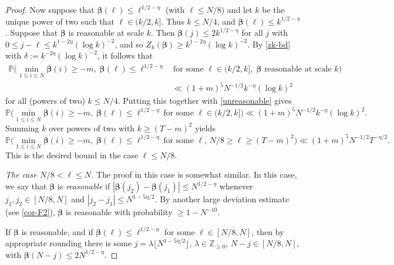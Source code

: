 \documentclass[11pt,reqno]{amsart}
\numberwithin{equation}{section}
\theoremstyle{definition}
\theoremstyle{remark}
\newcommand{\mb}{\mathbb}
\def\boldbeta{\boldsymbol\beta}
\renewcommand{\le}{\leqslant}
\renewcommand{\ge}{\geqslant}
\newcommand\Z{\mathbb{Z}}
\begin{document}
\begin{proof}
Now suppose that $\boldbeta(\ell) \le \ell^{1/2 - \eta}$ (with $\ell \le N/8$) and let $k$ be the unique power of two such that $\ell \in (k/2, k]$. Thus $k \le N/4$, and $\boldbeta(\ell) \le k^{1/2 - \eta}$. Suppose that $\boldbeta$ is reasonable at scale $k$. Then $\boldbeta(j) \le 2 k^{1/2 - \eta}$ for all $j$ with $0 \le j - \ell \le k^{1 - 2\eta} (\log k)^{-2}$, and so $Z_k(\boldbeta) \ge k^{1 - 2\eta} (\log k)^{-2}$. By \cref{zk-bd} with $\delta := k^{-2\eta} (\log k)^{-2}$, it follows that 
\begin{align*} \mb{P} \big( \min_{1 \le i \le N} \boldbeta(i) \ge -m, \; \boldbeta(\ell) \le \ell^{1/2 - \eta} & \, \mbox{for some $\ell \in (k/2, k]$}, \; \mbox{$\boldbeta$ reasonable at scale $k$}\big) \\ & \ll  (1 + m)^{5} N^{-1/2} k^{-\eta} (\log k)^2\end{align*} for all (powers of two) $k \le N/4$. Putting this together with \cref{unreasonable} gives
\[ \mb{P} \big( \min_{1 \le i \le N} \boldbeta(i) \ge -m,\; \boldbeta(\ell) \le \ell^{1/2 - \eta} \, \mbox{for some $\ell \in (k/2, k]$} \big) \ll  (1 + m)^{5} N^{-1/2} k^{-\eta} (\log k)^2.\] Summing $k$ over powers of two with $k \ge (T - m)^2$ yields
\[ \mb{P} \big( \min_{1 \le i \le N} \boldbeta(i) \ge -m, \; \boldbeta(\ell) \le \ell^{1/2 - \eta}\, \mbox{for some $\ell$, $N/8 \ge \ell \ge (T - m)^2$} \big) \ll  (1 + m)^{5} N^{-1/2} T^{-\eta/2}.\] 
This is the desired bound in the case $\ell \le N/8$.\vspace*{8pt}

\emph{The case $N/8 < \ell \le N$.} The proof in this case is somewhat similar. In this case, we say that $\boldbeta$ is \emph{reasonable} if $|\boldbeta(j_2) - \boldbeta(j_1)| \le N^{1/2 - \eta}$ whenever $j_1, j_2 \in [N/8, N]$ and $|j_2 - j_1| \le N^{1 - 5\eta/2}$. By another large deviation estimate (see \cref{cor-F2}), $\boldbeta$ is reasonable with probability $\ge 1 - N^{-10}$.

If $\boldbeta$ is reasonable, and if $\boldbeta(\ell) \le \ell^{1/2 - \eta}$ for some $\ell \in [N/8, N]$, then by appropriate rounding there is some $j = \lambda \lfloor N^{1 - 5\eta/2}\rfloor$, $\lambda \in \Z_{\ge 0}$, $N - j \in [N/8, N]$, with $\boldbeta(N - j) \le 2 N^{1/2 - \eta}$.


\end{proof}
\end{document}
